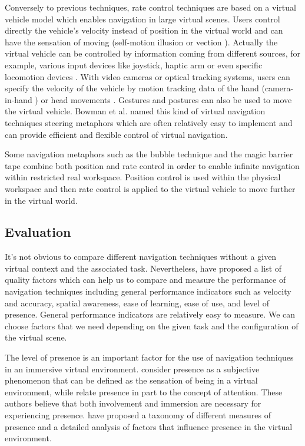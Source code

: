 Conversely to previous techniques, rate control techniques are based on a virtual vehicle model which enables navigation in large virtual scenes. Users control directly the vehicle's velocity instead of position in the virtual world and can have the sensation of moving (self-motion illusion or vection \citep{Riecke2012Vection}). Actually the virtual vehicle can be controlled by information coming from different sources, for example, various input devices like joystick, haptic arm \citep{Martin2012Forklift} or even specific locomotion devices \citep{Marchal2011JOYMAN}. With video cameras or optical tracking systems, users can specify the velocity of the vehicle by motion tracking data of the hand (camera-in-hand \citep{Ware1990EVC}) or head movements \citep{Bourdot2002HCNav}. Gestures \citep{Konrad2003Gesture} and postures \citep{Kapri2011Steering} can also be used to move the virtual vehicle. Bowman et al. named this kind of virtual navigation techniques steering metaphors \citep{Bowman2004UIT} which are often relatively easy to implement and can provide efficient and flexible control of virtual navigation.

Some navigation metaphors such as the bubble technique \citep{Dominjon2005Bubble} and the magic barrier tape \citep{Cirio2009MBT} combine both position and rate control in order to enable infinite navigation within restricted real workspace. Position control is used within the physical workspace and then rate control is applied to the virtual vehicle to move further in the virtual world.

\subsection{Evaluation}
It's not obvious to compare different navigation techniques without a given virtual context and the associated task. Nevertheless, \citet{Bowman1997TIV} have proposed a list of quality factors which can help us to compare and measure the performance of navigation techniques including general performance indicators such as velocity and accuracy, spatial awareness, ease of learning, ease of use, and level of presence. General performance indicators are relatively easy to measure. We can choose factors that we need depending on the given task and the configuration of the virtual scene.

The level of presence is an important factor for the use of navigation techniques in an immersive virtual environment. \citet{Slater1994DepthPre} consider presence as a subjective phenomenon that can be defined as the sensation of being in a virtual environment, while \citet{Witmer1998MPV} relate presence in part to the concept of attention. These authors believe that both involvement and immersion are necessary for experiencing presence. \citet{Schuemie2001Pres} have proposed a taxonomy of different measures of presence and a detailed analysis of factors that influence presence in the virtual environment.


